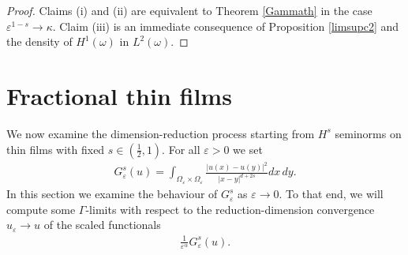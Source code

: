 \documentclass{article}
\newcommand{\e}{\varepsilon}
\begin{document}
\begin{proof}
Claims (i) and (ii) are equivalent to Theorem \ref{Gammath} in the case $\e^{1-s}\to \kappa$. Claim (iii) is an immediate consequence of Proposition \ref{limsupc2} and the density of $H^1(\omega)$ in  $L^2(\omega)$.
\end{proof}


\section{Fractional thin films}
%
We now examine the dimension-reduction process starting from $H^s$ seminorms on thin films with fixed $s\in(\frac12,1)$. For all $\e>0$ we set
\begin{eqnarray*}
G^s_\e(u) = \int_{\Omega_\e\times\Omega_\e} \frac{|u(x)-u(y)|^2}{|x-y|^{d+2s}} dx\,dy.
\end{eqnarray*}
In this section we examine the behaviour of $G^s_\e$ as $\e\to 0$. To that end, we will compute some $\Gamma$-limits with respect to the reduction-dimension convergence $u_\e\to u$ of the scaled functionals
\begin{eqnarray}\label{Gas}
\frac1{\e^\alpha} G^s_\e(u).
\end{eqnarray}
\end{document}
